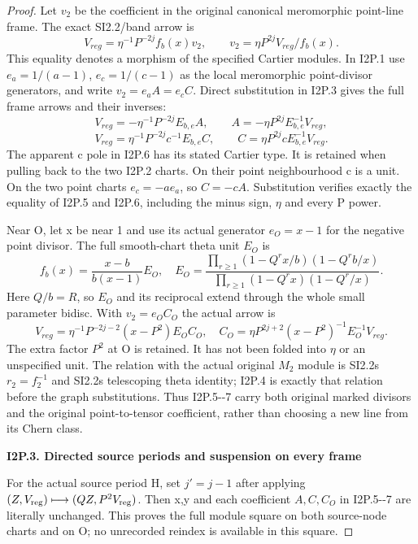 \begin{proof}
Let \(v_{2}\) be the coefficient in the original canonical meromorphic
point-line frame. The exact SI2.2/band arrow is
\[
 V_{reg}=\eta^{-1}P^{-2j} f_b(x)v_2,
 \qquad v_2=\eta P^{2j}V_{reg}/f_b(x).                    \tag{I2P.4}
\]
This equality denotes a morphism of the specified Cartier modules.
In I2P.1 use \(e_a=1/(a-1)\), \(e_c=1/(c-1)\) as the local meromorphic
point-divisor generators, and write \(v_{2}=e_a A=e_c C\). Direct substitution
in I2P.3 gives the full frame arrows and their inverses:
\[
 V_{reg}=-\eta^{-1}P^{-2j}E_{b,e}A,
 \qquad A=-\eta P^{2j}E_{b,e}^{-1}V_{reg},               \tag{I2P.5}
\]
\[
 V_{reg}=\eta^{-1}P^{-2j}c^{-1}E_{b,e}C,
 \qquad C=\eta P^{2j}cE_{b,e}^{-1}V_{reg}.                \tag{I2P.6}
\]
The apparent c pole in I2P.6 has its stated Cartier type. It is
retained when pulling back to the two I2P.2 charts. On their point
neighbourhood c is a unit. On the two point charts \(e_c=-a e_a\),
so \(C=-c A\). Substitution verifies exactly the equality of I2P.5 and
I2P.6, including the minus sign, \(\eta\) and every P power.

Near O, let x be near 1 and use its actual generator \(e_O=x-1\) for
the negative point divisor. The full smooth-chart theta unit \(E_O\) is
\[
 f_b(x)=\frac{x-b}{b(x-1)}E_O,
\quad E_O=
 \frac{\prod_{r\ge1}(1-Q^r x/b)(1-Q^r b/x)}
 {\prod_{r\ge1}(1-Q^r x)(1-Q^r/x)}.
\]
Here \(Q/b=R\), so \(E_O\) and its reciprocal extend through the whole
small parameter bidisc. With \(v_{2}=e_O C_O\) the actual arrow is
\[
 V_{reg}=\eta^{-1}P^{-2j-2}(x-P^2)E_O C_O,
 \quad C_O=\eta P^{2j+2}(x-P^2)^{-1}E_O^{-1}V_{reg}.
                                                               \tag{I2P.7}
\]
The extra factor \(P^{2}\) at O is retained. It has not been folded into
\(\eta\) or an unspecified unit. The relation with the actual original
\(M_{2}\) module is SI2.2\textquotesingle s \(r_{2}=f_{2}^{-1}\) and SI2.2\textquotesingle s telescoping theta identity;
I2P.4 is exactly that relation before the graph substitutions. Thus
I2P.5-\/-7 carry both original marked divisors and the original
point-to-tensor coefficient, rather than choosing a new line from
its Chern class.

\par

\medskip\noindent\textbf{I2P.3. Directed source periods and suspension on every frame}

\par\nobreak

For the actual source period H, set \(j'=j-1\) after applying
\((Z,V_{\rm reg})\longmapsto (QZ,P^{2}V_{\rm reg})\). Then x,y and each coefficient \(A,C,C_O\)
in I2P.5-\/-7 are literally unchanged. This proves the full module
square on both source-node charts and on O; no unrecorded reindex
is available in this square.


\end{proof}
